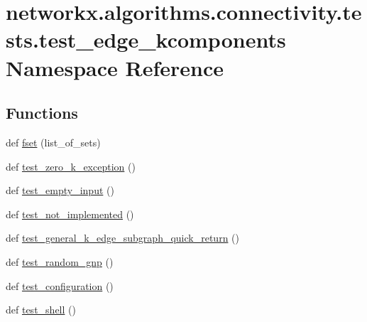 \hypertarget{namespacenetworkx_1_1algorithms_1_1connectivity_1_1tests_1_1test__edge__kcomponents}{}\section{networkx.\+algorithms.\+connectivity.\+tests.\+test\+\_\+edge\+\_\+kcomponents Namespace Reference}
\label{namespacenetworkx_1_1algorithms_1_1connectivity_1_1tests_1_1test__edge__kcomponents}
\subsection*{Functions}
\begin{DoxyCompactItemize}
\item 
def \hyperlink{namespacenetworkx_1_1algorithms_1_1connectivity_1_1tests_1_1test__edge__kcomponents_a0fa72c038058aabfa092e1f17fa39de0}{fset} (list\+\_\+of\+\_\+sets)
\item 
def \hyperlink{namespacenetworkx_1_1algorithms_1_1connectivity_1_1tests_1_1test__edge__kcomponents_a407e095effdc226a99fd1c71c01689eb}{test\+\_\+zero\+\_\+k\+\_\+exception} ()
\item 
def \hyperlink{namespacenetworkx_1_1algorithms_1_1connectivity_1_1tests_1_1test__edge__kcomponents_a7ce51f8c8642c83c0043d50425d05942}{test\+\_\+empty\+\_\+input} ()
\item 
def \hyperlink{namespacenetworkx_1_1algorithms_1_1connectivity_1_1tests_1_1test__edge__kcomponents_a68c3c9b5ea6cc9e9baf7fa1e65a193b7}{test\+\_\+not\+\_\+implemented} ()
\item 
def \hyperlink{namespacenetworkx_1_1algorithms_1_1connectivity_1_1tests_1_1test__edge__kcomponents_abaa7c9b166387f0f925e6303eded04b8}{test\+\_\+general\+\_\+k\+\_\+edge\+\_\+subgraph\+\_\+quick\+\_\+return} ()
\item 
def \hyperlink{namespacenetworkx_1_1algorithms_1_1connectivity_1_1tests_1_1test__edge__kcomponents_a1f8aa8641266adef19762473e48f9208}{test\+\_\+random\+\_\+gnp} ()
\item 
def \hyperlink{namespacenetworkx_1_1algorithms_1_1connectivity_1_1tests_1_1test__edge__kcomponents_ab8c21839e4c65e9a7d329ee86ea058d0}{test\+\_\+configuration} ()
\item 
def \hyperlink{namespacenetworkx_1_1algorithms_1_1connectivity_1_1tests_1_1test__edge__kcomponents_ade30b2107add23021497b04fd97c2543}{test\+\_\+shell} ()

\end{DoxyCompactItemize}

